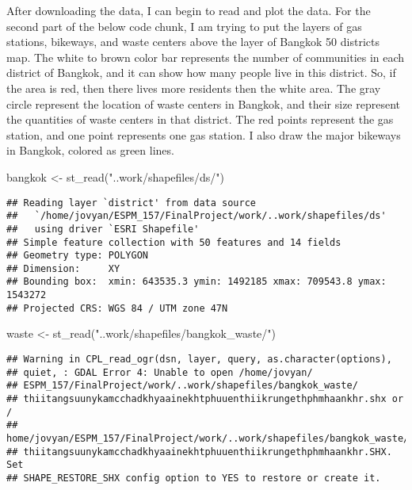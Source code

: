 \documentclass[
]{article}
\newenvironment{Shaded}{\begin{snugshade}}{\end{snugshade}}
\newcommand{\FunctionTok}[1]{\textcolor[rgb]{0.00,0.00,0.00}{#1}}
\newcommand{\NormalTok}[1]{#1}
\newcommand{\OtherTok}[1]{\textcolor[rgb]{0.56,0.35,0.01}{#1}}
\newcommand{\StringTok}[1]{\textcolor[rgb]{0.31,0.60,0.02}{#1}}
\begin{document}
After downloading the data, I can begin to read and plot the data. For
the second part of the below code chunk, I am trying to put the layers
of gas stations, bikeways, and waste centers above the layer of Bangkok
50 districts map. The white to brown color bar represents the number of
communities in each district of Bangkok, and it can show how many people
live in this district. So, if the area is red, then there lives more
residents then the white area. The gray circle represent the location of
waste centers in Bangkok, and their size represent the quantities of
waste centers in that district. The red points represent the gas
station, and one point represents one gas station. I also draw the major
bikeways in Bangkok, colored as green lines.

\begin{Shaded}
\begin{Highlighting}[]
\NormalTok{bangkok }\OtherTok{\textless{}{-}} \FunctionTok{st\_read}\NormalTok{(}\StringTok{"..work/shapefiles/ds/"}\NormalTok{)}
\end{Highlighting}
\end{Shaded}

\begin{verbatim}
## Reading layer `district' from data source 
##   `/home/jovyan/ESPM_157/FinalProject/work/..work/shapefiles/ds' 
##   using driver `ESRI Shapefile'
## Simple feature collection with 50 features and 14 fields
## Geometry type: POLYGON
## Dimension:     XY
## Bounding box:  xmin: 643535.3 ymin: 1492185 xmax: 709543.8 ymax: 1543272
## Projected CRS: WGS 84 / UTM zone 47N
\end{verbatim}

\begin{Shaded}
\begin{Highlighting}[]
\NormalTok{waste }\OtherTok{\textless{}{-}} \FunctionTok{st\_read}\NormalTok{(}\StringTok{"..work/shapefiles/bangkok\_waste/"}\NormalTok{)}
\end{Highlighting}
\end{Shaded}

\begin{verbatim}
## Warning in CPL_read_ogr(dsn, layer, query, as.character(options),
## quiet, : GDAL Error 4: Unable to open /home/jovyan/
## ESPM_157/FinalProject/work/..work/shapefiles/bangkok_waste/
## thiitangsuunykamcchadkhyaainekhtphuuenthiikrungethphmhaankhr.shx or /
## home/jovyan/ESPM_157/FinalProject/work/..work/shapefiles/bangkok_waste/
## thiitangsuunykamcchadkhyaainekhtphuuenthiikrungethphmhaankhr.SHX. Set
## SHAPE_RESTORE_SHX config option to YES to restore or create it.
\end{verbatim}
\end{document}
